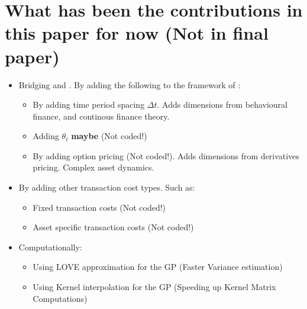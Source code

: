 \documentclass[11pt]{article}
\begin{document}
\section{What has been the contributions in this paper for now (Not in final paper)}\label{sec:contributions}
\begin{itemize}
  \item Bridging \textcite{CaiJuddXu2020} and \textcite{Scheidegger2023}. By adding the following to the framework of \textcite{Scheidegger2023}:
    \begin{itemize}
      \item By adding time period spacing $\Delta t$. Adds dimensions from behavioural finance, and continous finance theory.
      \item Adding $\theta_t$ \textbf{maybe} (Not coded!)
      \item By adding option pricing (Not coded!). Adds dimensions from derivatives pricing. Complex asset dynamics.
    \end{itemize} 
    \item By adding other transaction cost types. Such as:
    \begin{itemize}
      \item Fixed transaction costs (Not coded!)
      \item Asset specific transaction costs (Not coded!)
    \end{itemize}
    \item Computationally:
    \begin{itemize}
      \item Using LOVE approximation for the GP (Faster Variance estimation)
      \item Using Kernel interpolation for the GP (Speeding up Kernel Matrix Computations)
    \end{itemize}
\end{itemize}
\end{document}
